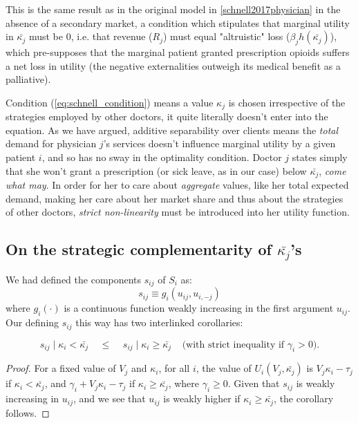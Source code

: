 \documentclass[../main.tex]{subfiles}
\begin{document}
This is the same result as in the original model in \ref{schnell2017physician} in the absence of a secondary market, a condition which stipulates that marginal utility in $\bar{\kappa_j}$ must be $0$, i.e. that revenue ($R_j$) must equal "altruistic" loss ($\beta_j h(\bar{\kappa_j})$), which pre-supposes that the marginal patient granted prescription opioids suffers a net loss in utility (the negative externalities outweigh its medical benefit as a palliative).

Condition (\ref{eq:schnell_condition}) means a value  $\kappa_j$ is chosen irrespective of the strategies employed by other doctors, it quite literally doesn't enter into the equation. As we have argued, additive separability over clients means the \textit{total} demand for physician $j$'s services doesn't influence marginal utility by a given patient $i$, and so has no sway in the optimality condition. Doctor $j$ states simply that she won't grant a prescription (or sick leave, as in our case) below $\bar{\kappa_j}$, \textit{come what may}. In order for her to care about \textit{aggregate} values, like her total expected demand, making her care about her market share and thus about the strategies of other doctors, \textit{strict non-linearity} must be introduced into her utility function.


\subsection{On the strategic complementarity of $\bar{\kappa_j}$'s}

We had defined the components $s_{ij}$ of $S_i$  as:
\[s_{ij} \equiv g_i(u_{ij}, u_{i,-j})\]
where $g_i(\cdot)$ is a continuous function weakly increasing in the first argument $u_{ij}$. Our defining $s_{ij}$ this way has two interlinked corollaries:

\begin{corollary}
\[s_{ij} \mid \kappa_i < \bar{\kappa_j} \;\;\;\; \leq     \;\;\;\; s_{ij} \mid \kappa_i \geq \bar{\kappa_j} \;\;\;\; \text{(with strict inequality if $\gamma_i > 0$).}\]
\end{corollary}

\begin{proof}
    For a fixed value of $V_j$ and $\kappa_i$, for all $i$, the value of $U_i(V_j, \bar{\kappa_j})$ is $V_j \kappa_i - \tau_j$ if $\kappa_i < \bar{\kappa_j}$, and $\gamma_i + V_j \kappa_i - \tau_j$ if $\kappa_i \geq \bar{\kappa_j}$, where $\gamma_i \geq 0$. Given that $s_{ij}$ is weakly increasing in $u_{ij}$, and we see that $u_{ij}$ is weakly higher if $\kappa_i \geq \bar{\kappa_j}$, the corollary follows.
\end{proof}
\end{document}
